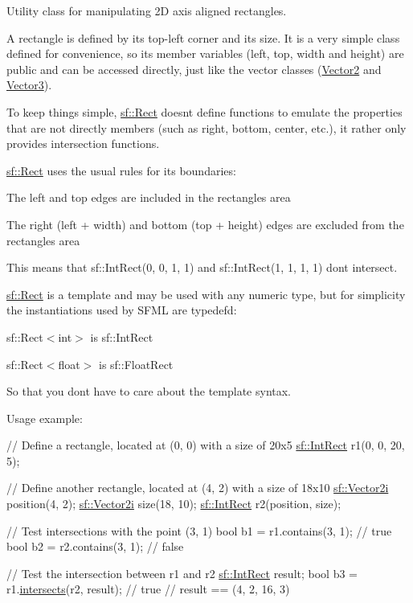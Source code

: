 Utility class for manipulating 2D axis aligned rectangles. 

A rectangle is defined by its top-\/left corner and its size. It is a very simple class defined for convenience, so its member variables (left, top, width and height) are public and can be accessed directly, just like the vector classes (\hyperlink{classsf_1_1_vector2}{Vector2} and \hyperlink{classsf_1_1_vector3}{Vector3}).

To keep things simple, \hyperlink{classsf_1_1_rect}{sf\+::\+Rect} doesn\textquotesingle{}t define functions to emulate the properties that are not directly members (such as right, bottom, center, etc.), it rather only provides intersection functions.

\hyperlink{classsf_1_1_rect}{sf\+::\+Rect} uses the usual rules for its boundaries\+: \begin{DoxyItemize}
\item The left and top edges are included in the rectangle\textquotesingle{}s area \item The right (left + width) and bottom (top + height) edges are excluded from the rectangle\textquotesingle{}s area\end{DoxyItemize}
This means that sf\+::\+Int\+Rect(0, 0, 1, 1) and sf\+::\+Int\+Rect(1, 1, 1, 1) don\textquotesingle{}t intersect.

\hyperlink{classsf_1_1_rect}{sf\+::\+Rect} is a template and may be used with any numeric type, but for simplicity the instantiations used by S\+F\+ML are typedef\textquotesingle{}d\+: \begin{DoxyItemize}
\item sf\+::\+Rect$<$int$>$ is sf\+::\+Int\+Rect \item sf\+::\+Rect$<$float$>$ is sf\+::\+Float\+Rect\end{DoxyItemize}
So that you don\textquotesingle{}t have to care about the template syntax.

Usage example\+: 
\begin{DoxyCode}
\textcolor{comment}{// Define a rectangle, located at (0, 0) with a size of 20x5}
\hyperlink{classsf_1_1_rect}{sf::IntRect} r1(0, 0, 20, 5);

\textcolor{comment}{// Define another rectangle, located at (4, 2) with a size of 18x10}
\hyperlink{classsf_1_1_vector2}{sf::Vector2i} position(4, 2);
\hyperlink{classsf_1_1_vector2}{sf::Vector2i} size(18, 10);
\hyperlink{classsf_1_1_rect}{sf::IntRect} r2(position, size);

\textcolor{comment}{// Test intersections with the point (3, 1)}
\textcolor{keywordtype}{bool} b1 = r1.contains(3, 1); \textcolor{comment}{// true}
\textcolor{keywordtype}{bool} b2 = r2.contains(3, 1); \textcolor{comment}{// false}

\textcolor{comment}{// Test the intersection between r1 and r2}
\hyperlink{classsf_1_1_rect}{sf::IntRect} result;
\textcolor{keywordtype}{bool} b3 = r1.\hyperlink{classsf_1_1_rect_ad90321b1135cad31589f2db2f9b772db}{intersects}(r2, result); \textcolor{comment}{// true}
\textcolor{comment}{// result == (4, 2, 16, 3)}
\end{DoxyCode}
 

